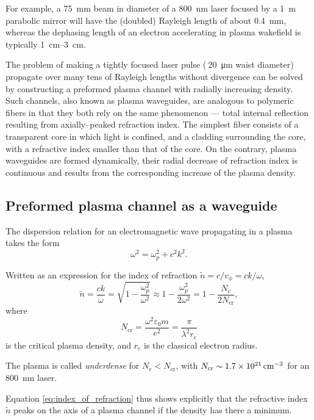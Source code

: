 \documentclass[../main.tex]{subfiles}
\begin{document}
For example, a \SI{75}{\mm} beam in diameter of a \SI{800}{\nm} laser focused by a \SI{1}{\m} parabolic mirror will have the (doubled) Rayleigh length of about \SI{0.4}{\mm}, whereas the dephasing length of an electron accelerating in plasma wakefield is typically \SIrange{1}{3}{\cm}.

The problem of making a tightly focused laser pulse ($~$\SI{20}{\um} waist diameter) propagate over many tens of Rayleigh lengths without divergence can be solved by constructing a preformed plasma channel with radially increasing density. Such channels, also known as plasma waveguides, are analogous to polymeric fibers in that they both rely on the same phenomenon --- total internal reflection resulting from axially--peaked refraction index. The simplest fiber consists of a transparent core in which light is confined, and a cladding surrounding the core, with a refractive index smaller than that of the core. On the contrary, plasma waveguides are formed dynamically, their radial decrease of refraction index is continuous and results from the corresponding increase of the plasma density.
\subsection*{Preformed plasma channel as a waveguide}
The dispersion relation \cite{Chen1984IntroductionFusion} for an electromagnetic wave propagating in a plasma takes the form 
\begin{equation}
\omega^2=\omega_p^2+c^2 k^2.
\end{equation}

Written as an expression for the index of refraction $\tilde{n}=c/v_\phi = ck/\omega$,
\begin{equation}
\tilde{n}=\frac{c k}{\omega}=\sqrt{1-\frac{\omega_p^2}{\omega^2}}\approx1-\frac{\omega_p^2}{2\omega^2}=1-\frac{N_e}{2N_\text{cr}}, \label{eq:index_of_refraction}
\end{equation}
where
\begin{equation}
    N_\text{cr}=\frac{\omega^2\varepsilon_0 m}{e^2}=\frac{\pi}{\lambda^2 r_e}
\end{equation}
is the critical plasma density, and $r_e$ is the classical electron radius.

The plasma is called \textit{underdense} for $N_e < N_\text{cr}$, with $N_\text{cr}\\\sim\SI{1.7e21}{\per\cubic\cm}$ for an \SI{800}{\nm} laser.

Equation \ref{eq:index_of_refraction} thus shows explicitly that the refractive index $\tilde{n}$ peaks on the axis of a plasma channel if the density has there a minimum.
\end{document}
